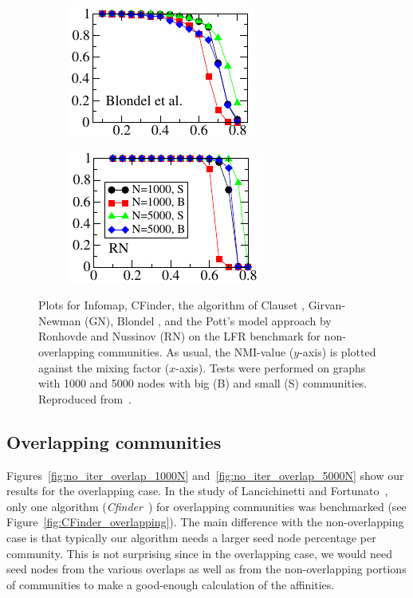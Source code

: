 \begin{figure}[h!]
\begin{subfigure}{0.33\textwidth}
    \end{subfigure}%
    \begin{subfigure}{0.33\textwidth}
    \centering
    \includegraphics[width=\otherplotswidth]{lfrpaper/5_split_kropped.pdf}
    \end{subfigure}%
    \begin{subfigure}{0.33\textwidth}
    \centering
    \includegraphics[width=\otherplotswidth]{lfrpaper/6_split_kropped.pdf}
    \end{subfigure}%
    \caption{
        Plots for Infomap, CFinder, the algorithm of Clauset \etal, Girvan-Newman (GN), Blondel \etal, 
        and the Pott's model approach by Ronhovde and Nussinov (RN) on the LFR benchmark for non-overlapping 
		communities. As usual, the NMI-value ($y$-axis) is plotted against the mixing factor ($x$-axis).
        Tests were performed on graphs with 1000 and 5000 nodes with big (B) and small (S) communities.
        Reproduced from~\cite{LF09}.
    }\label{fig:Infomap_etal}
\end{figure}



\subsection{Overlapping communities}
Figures~\ref{fig:no_iter_overlap_1000N} and~\ref{fig:no_iter_overlap_5000N} 
show our results for the overlapping case. In the study of Lancichinetti and Fortunato~\cite{LF09}, 
only one algorithm (\emph{Cfinder}~\cite{PDFV05}) for overlapping communities was benchmarked 
(see Figure~\ref{fig:CFinder_overlapping}). 
The main difference with the non-overlapping case is that typically our algorithm needs a larger 
seed node percentage per community. This is not surprising since in the overlapping case, we would 
need seed nodes from the various overlaps as well as from the non-overlapping portions of communities 
to make a good-enough calculation of the affinities. 

